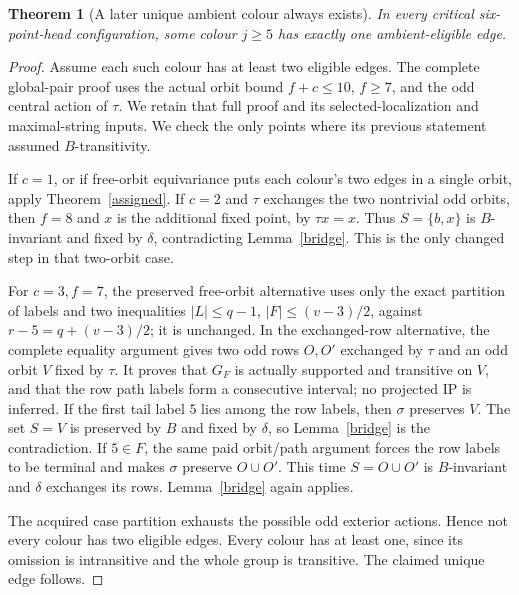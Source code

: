 \documentclass[11pt,a4paper]{article}
\newtheorem{theorem}[lemma]{Theorem}
\begin{document}
\begin{theorem}[A later unique ambient colour always exists]
In every critical six-point-head configuration, some colour
$j\ge5$ has exactly one ambient-eligible edge.
\end{theorem}
\begin{proof}
Assume each such colour has at least two eligible edges. The complete
global-pair proof uses the actual orbit bound $f+c\le10$, $f\ge7$,
and the odd central action of $\tau$. We retain that full proof and
its selected-localization and maximal-string inputs. We check the
only points where its previous statement assumed $B$-transitivity.

If $c=1$, or if free-orbit equivariance puts each colour's two
edges in a single orbit, apply Theorem~\ref{assigned}.
If $c=2$ and $\tau$ exchanges the two nontrivial odd orbits,
then $f=8$ and $x$ is the additional fixed point, by
$\tau x=x$. Thus $S=\{b,x\}$ is $B$-invariant and fixed by
$\delta$, contradicting Lemma~\ref{bridge}.
This is the only changed step in that two-orbit case.

For $c=3,f=7$, the preserved free-orbit alternative uses only
the exact partition of labels and two inequalities
$|L|\le q-1$, $|F|\le(v-3)/2$, against
$r-5=q+(v-3)/2$; it is unchanged.
In the exchanged-row alternative, the complete equality argument
gives two odd rows $O,O'$ exchanged by $\tau$ and an odd orbit
$V$ fixed by $\tau$. It proves that $G_F$ is actually supported
and transitive on $V$, and that the row path labels form a
consecutive interval; no projected IP is inferred.
If the first tail label $5$ lies among the row labels, then
$\sigma$ preserves $V$. The set $S=V$ is preserved by $B$
and fixed by $\delta$, so Lemma~\ref{bridge} is the contradiction.
If $5\in F$, the same paid orbit/path argument forces the row
labels to be terminal and makes $\sigma$ preserve $O\cup O'$.
This time $S=O\cup O'$ is $B$-invariant and $\delta$ exchanges
its rows. Lemma~\ref{bridge} again applies.

The acquired case partition exhausts the possible odd exterior
actions. Hence not every colour has two eligible edges. Every
colour has at least one, since its omission is intransitive and
the whole group is transitive. The claimed unique edge follows.
\end{proof}
\end{document}
